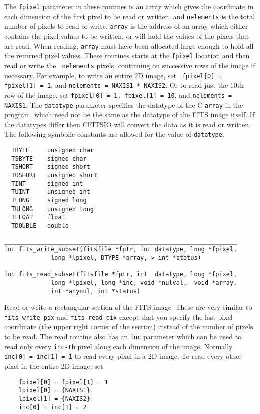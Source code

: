\documentclass[11pt]{article}
\begin{document}
The {\tt fpixel} parameter in these routines is an array which gives
the coordinate in each dimension of the first pixel to be read or
written, and {\tt nelements} is the total number of pixels to read or
write.  {\tt array} is the address of an array which either contains
the pixel values to be written, or will hold the values of the pixels
that are read.  When reading, {\tt array} must have been allocated
large enough to hold all the returned pixel values.  These routines
starts at the {\tt fpixel} location and then read or write the {\tt
nelements} pixels, continuing on successive rows of the image if
necessary.  For example, to write an entire 2D image, set {\tt
fpixel[0] = fpixel[1] = 1}, and {\tt nelements = NAXIS1 * NAXIS2}.  Or
to read just the 10th row of the image, set {\tt fpixel[0] = 1,
fpixel[1] = 10}, and {\tt nelements = NAXIS1}.  The {\tt datatype}
parameter specifies the datatype of the C {\tt array} in the program,
which need not be the same as the datatype of the FITS image itself.
If the datatypes differ then CFITSIO will convert the data as it is
read or written.  The following symbolic constants are allowed for the
value of {\tt datatype}:
\begin{verbatim}
  TBYTE     unsigned char
  TSBYTE    signed char
  TSHORT    signed short
  TUSHORT   unsigned short
  TINT      signed int
  TUINT     unsigned int
  TLONG     signed long
  TULONG    unsigned long
  TFLOAT    float
  TDOUBLE   double
\end{verbatim}


\begin{verbatim}
_________________________________________________________________
int fits_write_subset(fitsfile *fptr, int datatype, long *fpixel,
             long *lpixel, DTYPE *array, > int *status)

int fits_read_subset(fitsfile *fptr, int  datatype, long *fpixel,
             long *lpixel, long *inc, void *nulval,  void *array,
             int *anynul, int *status)
\end{verbatim}

Read or write a rectangular section of the FITS image.  These are very
similar to {\tt fits\_write\_pix} and {\tt fits\_read\_pix} except that
you specify the last pixel coordinate (the upper right corner of the
section) instead of the number of pixels to be read.  The read routine
also has an {\tt inc} parameter which can be used to read only every
{\tt inc-th} pixel along each dimension of the image.  Normally  {\tt
inc[0] = inc[1] = 1} to read every pixel in a 2D image.  To read every
other pixel in the entire 2D image, set
\begin{verbatim}
    fpixel[0] = fpixel[1] = 1
    lpixel[0] = {NAXIS1}
    lpixel[1] = {NAXIS2}  
    inc[0] = inc[1] = 2  
\end{verbatim}
\end{document}
